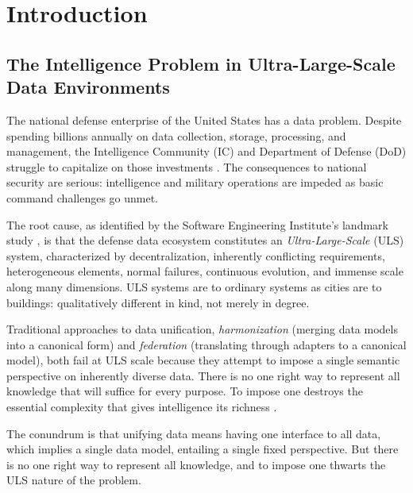 \documentclass[11pt,a4paper]{article}
\theoremstyle{definition}
\begin{document}

\section{Introduction}

\subsection{The Intelligence Problem in Ultra-Large-Scale Data Environments}
\label{sec:uls}

The national defense enterprise of the United States has a data problem. Despite spending billions annually on data collection, storage, processing, and management, the Intelligence Community (IC) and Department of Defense (DoD) struggle to capitalize on those investments \citep{sei2006uls, yoakumstover2025semapp}. The consequences to national security are serious: intelligence and military operations are impeded as basic command challenges go unmet.

The root cause, as identified by the Software Engineering Institute's landmark study \citep{sei2006uls}, is that the defense data ecosystem constitutes an \emph{Ultra-Large-Scale} (ULS) system, characterized by decentralization, inherently conflicting requirements, heterogeneous elements, normal failures, continuous evolution, and immense scale along many dimensions. ULS systems are to ordinary systems as cities are to buildings: qualitatively different in kind, not merely in degree.

Traditional approaches to data unification, \emph{harmonization} (merging data models into a canonical form) and \emph{federation} (translating through adapters to a canonical model), both fail at ULS scale because they attempt to impose a single semantic perspective on inherently diverse data. There is no one right way to represent all knowledge that will suffice for every purpose. To impose one destroys the essential complexity that gives intelligence its richness \citep{yoakumstover2025semapp}.

The conundrum is that unifying data means having one interface to all data, which implies a single data model, entailing a single fixed perspective. But there is no one right way to represent all knowledge, and to impose one thwarts the ULS nature of the problem.
\end{document}
